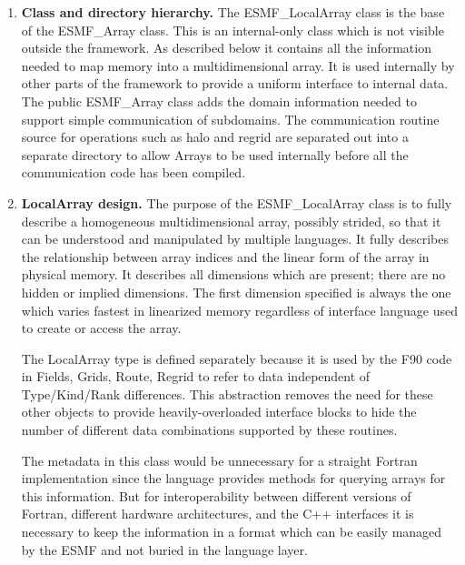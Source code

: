 

\begin{enumerate}

\item{\bf Class and directory hierarchy.}
The ESMF\_LocalArray class is the base of the ESMF\_Array class.
This is an internal-only class which is not visible outside the framework.
As described below it contains all the information needed to
map memory into a multidimensional array.  It is used internally
by other parts of the framework to provide a uniform interface to 
internal data.  The public ESMF\_Array class
adds the domain information needed to support simple communication of
subdomains.  The communication routine source for operations such
as halo and regrid are separated out into a separate directory 
to allow Arrays to be used internally before all the 
communication code has been compiled.

\item{\bf LocalArray design.}
The purpose of the ESMF\_LocalArray class is to fully describe a homogeneous
multidimensional array, possibly strided, so that it can be understood
and manipulated by multiple languages.   It fully describes the
relationship between array indices and the linear form of the array
in physical memory.  It describes all dimensions which are present;
there are no hidden or implied dimensions.  The first dimension specified
is always the one which varies fastest in linearized memory regardless of
interface language used to create or access the array.

The LocalArray type is defined separately because it is used by the
F90 code in Fields, Grids, Route, Regrid to refer to data 
independent of Type/Kind/Rank differences.  This abstraction removes
the need for these other objects to provide
heavily-overloaded interface blocks to hide the number of
different data combinations supported by these routines.

The metadata in this class would be unnecessary for a straight
Fortran implementation since the language provides methods for querying
arrays for this information.  But for interoperability between different
versions of Fortran, different hardware architectures, 
and the C++ interfaces
it is necessary to keep the information in a format which can be
easily managed by the ESMF and not buried in the language layer.



\end{enumerate}
